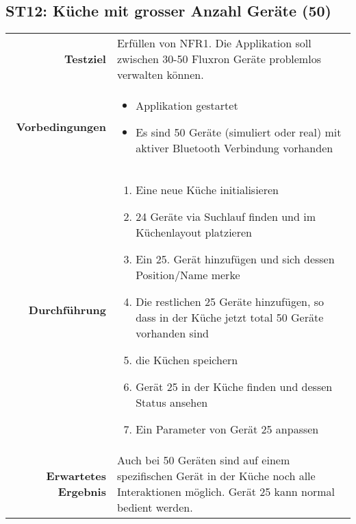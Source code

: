 \subsection{ST12: Küche mit grosser Anzahl Geräte (50)}
\begin{table}[H]
\begin{tabularx}{\textwidth}{r X }
\textbf{Testziel} & Erfüllen von \ac{NFR}1. Die Applikation soll zwischen 30-50 Fluxron Geräte problemlos verwalten können. \\
\textbf{Vorbedingungen} & \begin{itemize}
\item Applikation gestartet
\item Es sind 50 Geräte (simuliert oder real) mit aktiver Bluetooth Verbindung vorhanden
\end{itemize} \\
\textbf{Durchführung} & \begin{enumerate}
\item Eine neue Küche initialisieren
\item 24 Geräte via Suchlauf finden und im Küchenlayout platzieren
\item Ein 25. Gerät hinzufügen und sich dessen Position/Name merke
\item Die restlichen 25 Geräte hinzufügen, so dass in der Küche jetzt total 50 Geräte vorhanden sind
\item die Küchen speichern
\item Gerät 25 in der Küche finden und dessen Status ansehen
\item Ein Parameter von Gerät 25 anpassen
\end{enumerate} \\
\textbf{Erwartetes Ergebnis} & Auch bei 50 Geräten sind auf einem spezifischen Gerät in der Küche noch alle Interaktionen möglich. Gerät 25 kann normal bedient werden.\\
\end{tabularx}
\end{table}

